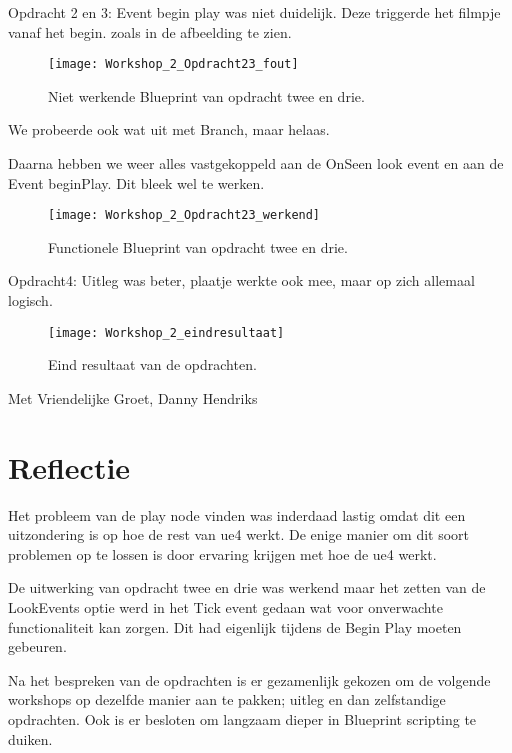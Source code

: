 Opdracht 2 en 3: Event begin play was niet duidelijk. Deze triggerde het filmpje vanaf het begin.
zoals in de afbeelding te zien.

\begin{figure}[!ht]
  \centering
    \texttt{[image: Workshop\_2\_Opdracht23\_fout]}
    \caption{Niet werkende Blueprint van opdracht twee en drie.}
\end{figure}

We probeerde ook wat uit met Branch, maar helaas.

Daarna hebben we weer alles vastgekoppeld aan de OnSeen look event en aan de Event beginPlay. Dit bleek wel te werken.

\begin{figure}[!ht]
  \centering
    \texttt{[image: Workshop\_2\_Opdracht23\_werkend]}
    \caption{Functionele Blueprint van opdracht twee en drie.}
\end{figure}


Opdracht4: Uitleg was beter, plaatje werkte ook mee, maar op zich allemaal logisch.

\begin{figure}[!ht]
  \centering
    \texttt{[image: Workshop\_2\_eindresultaat]}
    \caption{Eind resultaat van de opdrachten.}
\end{figure}

Met Vriendelijke Groet,
Danny Hendriks 

\section{Reflectie}
Het probleem van de play node vinden was inderdaad lastig omdat dit een uitzondering is op hoe de rest van \gls{ue4} werkt. De enige manier om dit soort problemen op te lossen is door ervaring krijgen met hoe de {ue4} werkt.

De uitwerking van opdracht twee en drie was werkend maar het zetten van de LookEvents optie werd in het Tick event gedaan wat voor onverwachte functionaliteit kan zorgen. Dit had eigenlijk tijdens de Begin Play moeten gebeuren.

Na het bespreken van de opdrachten is er gezamenlijk gekozen om de volgende workshops op dezelfde manier aan te pakken; uitleg en dan zelfstandige opdrachten. Ook is er besloten om langzaam dieper in Blueprint scripting te duiken.

